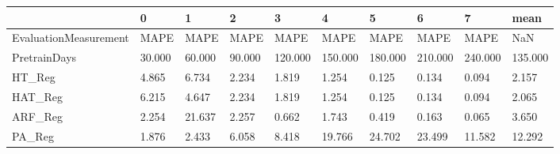 \begin{tabular}{llllllllll}
\toprule
{} &      0 &      1 &      2 &       3 &       4 &       5 &       6 &       7 &    mean \\
\midrule
EvaluationMeasurement &   MAPE &   MAPE &   MAPE &    MAPE &    MAPE &    MAPE &    MAPE &    MAPE &     NaN \\
PretrainDays          & 30.000 & 60.000 & 90.000 & 120.000 & 150.000 & 180.000 & 210.000 & 240.000 & 135.000 \\
HT\_Reg                &  4.865 &  6.734 &  2.234 &   1.819 &   1.254 &   0.125 &   0.134 &   0.094 &   2.157 \\
HAT\_Reg               &  6.215 &  4.647 &  2.234 &   1.819 &   1.254 &   0.125 &   0.134 &   0.094 &   2.065 \\
ARF\_Reg               &  2.254 & 21.637 &  2.257 &   0.662 &   1.743 &   0.419 &   0.163 &   0.065 &   3.650 \\
PA\_Reg                &  1.876 &  2.433 &  6.058 &   8.418 &  19.766 &  24.702 &  23.499 &  11.582 &  12.292 \\
\bottomrule
\end{tabular}
